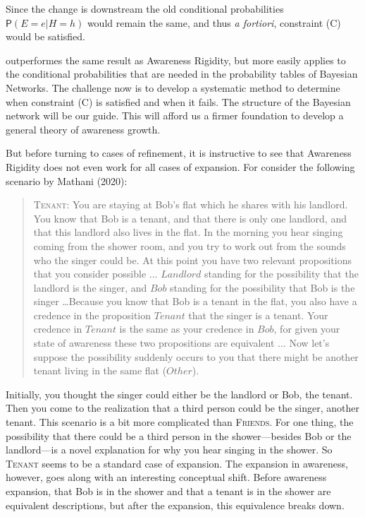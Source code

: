 \documentclass[
  11pt,
  dvipsnames,enabledeprecatedfontcommands]{scrartcl}
\newcommand{\pr}[1]{\ensuremath{\mathsf{P}(#1)}}
\begin{document}
Since the change is downstream the old conditional probabilities
\(\pr{E=e \vert H=h}\) would remain the same, and thus \emph{a
fortiori}, constraint (C) would be satisfied.

outperformes the same result as Awareness Rigidity, but more easily
applies to the conditional probabilities that are needed in the
probability tables of Bayesian Networks. The challenge now is to develop
a systematic method to determine when constraint (C) is satisfied and
when it fails. The structure of the Bayesian network will be our guide.
This will afford us a firmer foundation to develop a general theory of
awareness growth.

But before turning to cases of refinement, it is instructive to see that
Awareness Rigidity does not even work for all cases of expansion. For
consider the following scenario by Mathani (2020):

\begin{quote}
\textsc{Tenant}: You are staying at Bob's flat which he shares with his landlord. You know that Bob is a tenant, and that there is only one landlord, and that this landlord also lives in the flat. In the morning you hear singing coming from the shower room, and you try to work out from the sounds who the singer could be. At this point you have two relevant propositions that you consider possible ... $Landlord$ standing for the possibility that the landlord is the singer, and $Bob$ standing for the possibility that Bob is the singer  \dots  Because you know that Bob is a tenant in the flat, you also have a credence in the proposition $Tenant$ that the singer is a tenant. Your credence in $Tenant$ is the same as your credence in $Bob$, for given your state of awareness these two propositions are equivalent ... Now let's suppose the possibility suddenly occurs to you that there might be another tenant living in the same flat  ($Other$).
\end{quote}

\doublespace

\noindent Initially, you thought the singer could either be the landlord
or Bob, the tenant. Then you come to the realization that a third person
could be the singer, another tenant. This scenario is a bit more
complicated than \textsc{Friends}. For one thing, the possibility that
there could be a third person in the shower---besides Bob or the
landlord---is a novel explanation for why you hear singing in the
shower. So \textsc{Tenant} seems to be a standard case of expansion. The
expansion in awareness, however, goes along with an interesting
conceptual shift. Before awareness expansion, that Bob is in the shower
and that a tenant is in the shower are equivalent descriptions, but
after the expansion, this equivalence breaks down.
\end{document}
